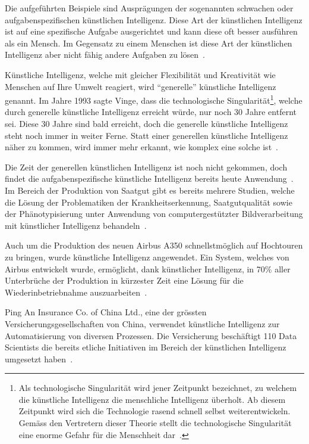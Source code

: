 Die aufgeführten Beispiele sind Ausprägungen der sogenannten schwachen oder aufgabenspezifischen künstlichen Intelligenz. Diese Art der künstlichen Intelligenz ist auf eine spezifische Aufgabe ausgerichtet und kann diese oft besser ausführen als ein Mensch. Im Gegensatz zu einem Menschen ist diese Art der künstlichen Intelligenz aber nicht fähig andere Aufgaben zu lösen~\autocite{Lu2018}.

Künstliche Intelligenz, welche mit gleicher Flexibilität und Kreativität wie Menschen auf Ihre Umwelt reagiert, wird \enquote{generelle} künstliche Intelligenz genannt. Im Jahre 1993 sagte Vinge, dass die technologische Singularität\footnote{Als technologische Singularität wird jener Zeitpunkt bezeichnet, zu welchem die künstliche Intelligenz die menschliche Intelligenz überholt. Ab diesem Zeitpunkt wird sich die Technologie rasend schnell selbst weiterentwickeln. Gemäss den Vertretern dieser Theorie stellt die technologische Singularität eine enorme Gefahr für die Menschheit dar~\autocite{Tredinnick2017}.}, welche durch generelle künstliche Intelligenz erreicht würde, nur noch 30 Jahre entfernt sei. Diese 30 Jahre sind bald erreicht, doch die generelle künstliche Intelligenz steht noch immer in weiter Ferne. Statt einer generellen künstliche Intelligenz näher zu kommen, wird immer mehr erkannt, wie komplex eine solche ist~\autocite{Tredinnick2017}.

Die Zeit der generellen künstlichen Intelligenz ist noch nicht gekommen, doch findet die aufgabenspezifische künstliche Intelligenz bereits heute Anwendung~\autocite{Tredinnick2017}. Im Bereich der Produktion von Saatgut gibt es bereits mehrere Studien, welche die Lösung der Problematiken der Krankheitserkennung, Saatgutqualität sowie der Phänotypisierung unter Anwendung von computergestützter Bildverarbeitung mit künstlicher Intelligenz behandeln~\autocite{Patricio2018}. 

Auch um die Produktion des neuen Airbus A350 schnellstmöglich auf Hochtouren zu bringen, wurde künstliche Intelligenz angewendet. Ein System, welches von Airbus entwickelt wurde, ermöglicht, dank künstlicher Intelligenz, in 70\% aller Unterbrüche der Produktion in kürzester Zeit eine Lösung für die Wiederinbetriebnahme auszuarbeiten~\autocite{Ransbotham2017}.

Ping An Insurance Co. of China Ltd., eine der grössten Versicherungsgesellschaften von China, verwendet künstliche Intelligenz zur Automatisierung von diversen Prozessen. Die Versicherung beschäftigt 110 Data Scientists die bereits etliche Initiativen im Bereich der künstlichen Intelligenz umgesetzt haben~\autocite{Ransbotham2017}.

